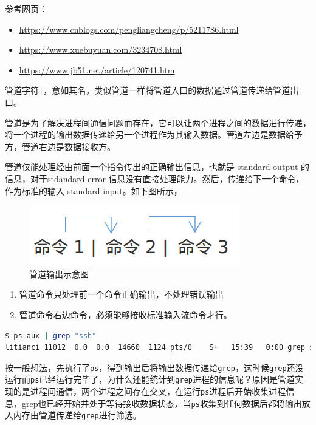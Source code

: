 \documentclass[doctor,openright,twoside]{sjtuthesis}
\providecommand{\tightlist}{%
    \setlength{\itemsep}{0pt}\setlength{\parskip}{0pt}}
\newcommand{\passthrough}[1]{#1}
\theoremstyle{plain}
\theoremstyle{definition}
\theoremstyle{remark}
\theoremstyle{ocrenumbox}
\theoremstyle{plain}
\begin{document}
参考网页：

\begin{itemize}
\tightlist
\item
  \url{https://www.cnblogs.com/pengliangcheng/p/5211786.html}
\item
  \url{https://www.xuebuyuan.com/3234708.html}
\item
  \url{https://www.jb51.net/article/120741.htm}
\end{itemize}

管道字符\passthrough{\lstinline!|!}，意如其名，类似管道一样将管道入口的数据通过管道传递给管道出口。

管道是为了解决进程间通信问题而存在，它可以让两个进程之间的数据进行传递，将一个进程的输出数据传递给另一个进程作为其输入数据。管道左边是数据给予方，管道右边是数据接收方。

管道仅能处理经由前面一个指令传出的正确输出信息，也就是 standard output
的信息，对于stdandard error
信息没有直接处理能力。然后，传递给下一个命令，作为标准的输入 standard
input。如下图所示，

\begin{figure}
\includegraphics{shell-pipe} \caption[管道输出示意图]{管道输出示意图}\label{fig:shell-pipe}
\end{figure}

\begin{enumerate}
\def\labelenumi{\arabic{enumi}.}
\tightlist
\item
  管道命令只处理前一个命令正确输出，不处理错误输出
\item
  管道命令右边命令，必须能够接收标准输入流命令才行。
\end{enumerate}

\begin{lstlisting}[language=bash]
$ ps aux | grep "ssh"
litianci 11012  0.0  0.0  14660  1124 pts/0    S+   15:39   0:00 grep ssh
\end{lstlisting}

按一般想法，先执行了\passthrough{\lstinline!ps!}，得到输出后将输出数据传递给\passthrough{\lstinline!grep!}，这时候\passthrough{\lstinline!grep!}还没运行而\passthrough{\lstinline!ps!}已经运行完毕了，为什么还能统计到\passthrough{\lstinline!grep!}进程的信息呢？原因是管道实现的是进程间通信，两个进程之间存在交叉，在运行\passthrough{\lstinline!ps!}进程后开始收集进程信息，grep也已经开始并处于等待接收数据状态，当\passthrough{\lstinline!ps!}收集到任何数据后都将输出放入内存由管道传递给\passthrough{\lstinline!grep!}进行筛选。
\end{document}
